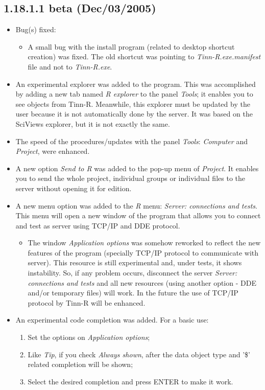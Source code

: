 \subsection*{1.18.1.1 beta (Dec/03/2005)}
\begin{itemize}
  \item Bug(s) fixed:
    \begin{itemize}
      \item A small bug with the install program (related to desktop shortcut creation) was fixed.
        The old shortcut was pointing
        to \textit{Tinn-R.exe.manifest} file and not to \textit{Tinn-R.exe}.
    \end{itemize}
  \item An experimental \RR{} explorer was added to the program. This was
    accomplished by adding a new tab named \textit{R explorer} to the panel
    \textit{Tools}; it enables you to see \RR{} objects from
    Tinn-R. Meanwhile, this explorer must be updated by the user
    because it is not automatically done by the \RR{} server.
    It was based on the SciViews \RR{} explorer, but it is not exactly
    the same.
  \item The speed of the procedures/updates with the panel \textit{Tools}:
    \textit{Computer} and \textit{Project}, were enhanced.
  \item A new option \textit{Send to R} was added to the pop-up menu of
    \textit{Project}. It enables you to send the whole project,
    individual groups or individual files to the server without
    opening it for edition.
  \item A new menu option was added to the \textit{R} menu:
    \textit{Server: connections and tests}. This menu will open a
    new window of the program that allows you to connect and test
    \RR{} as server using TCP/IP and DDE protocol.
    \begin{itemize}
      \item The window \textit{Application options} was somehow reworked
        to reflect the new features of the program (specially TCP/IP
        protocol to communicate with \RR{} server). This resource is
        still experimental and, under tests, it shows instability. So,
        if any problem occurs, disconnect the server
        \textit{Server: connections and tests} and all new resources
        (using another option - DDE and/or temporary files) will work.
        In the future the use of TCP/IP protocol by Tinn-R will be
        enhanced.
    \end{itemize}
  \item An experimental code completion was added. For a basic use:
    \begin{enumerate}
      \item Set the options on \textit{Application options};
      \item Like \textit{Tip}, if you check \textit{Always shown}, after the
        data object type and '\$' related completion will be shown;
      \item Select the desired completion and press ENTER to make it work.


\end{enumerate}
\end{itemize}
